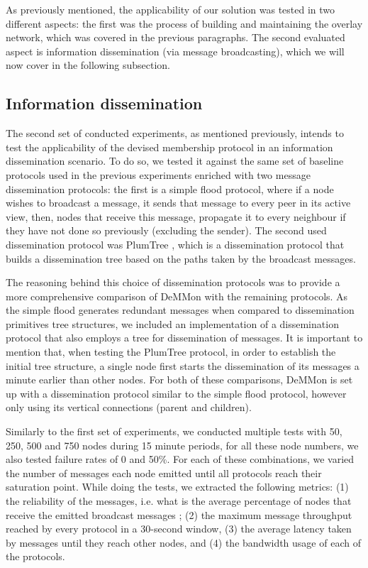 
As previously mentioned, the applicability of our solution was tested in two different aspects: the first was the process of building and maintaining the overlay network, which was covered in the previous paragraphs. The second evaluated aspect is information dissemination (via message broadcasting), which we will now cover in the following subsection.

\subsection{Information dissemination}

The second set of conducted experiments, as mentioned previously, intends to test the applicability of the devised membership protocol in an information dissemination scenario. To do so, we tested it against the same set of baseline protocols used in the previous experiments enriched with two message dissemination protocols: the first is a simple flood protocol, where if a node wishes to broadcast a message, it sends that message to every peer in its active view, then, nodes that receive this message, propagate it to every neighbour if they have not done so previously (excluding the sender). The second used dissemination protocol was PlumTree \cite{plumTree}, which is a dissemination protocol that builds a dissemination tree based on the paths taken by the broadcast messages.

The reasoning behind this choice of dissemination protocols was to provide a more comprehensive comparison of DeMMon with the remaining protocols. As the simple flood generates redundant messages when compared to dissemination primitives tree structures, we included an implementation of a dissemination protocol that also employs a tree for dissemination of messages. It is important to mention that, when testing the PlumTree protocol, in order to establish the initial tree structure, a single node first starts the dissemination of its messages a minute earlier than other nodes. For both of these comparisons, DeMMon is set up with a dissemination protocol similar to the simple flood protocol, however only using its vertical connections (parent and children).

Similarly to the first set of experiments, we conducted multiple tests with 50, 250, 500 and 750 nodes during 15 minute periods, for all these node numbers, we also tested failure rates of 0 and 50\%. For each of these combinations, we varied the number of messages each node emitted until all protocols reach their saturation point. While doing the tests, we extracted the following metrics: (1) the reliability of the messages, i.e. what is the average percentage of nodes that receive the emitted broadcast messages ; (2) the maximum message throughput reached by every protocol in a 30-second window, (3) the average latency taken by messages until they reach other nodes, and (4) the bandwidth usage of each of the protocols. 

